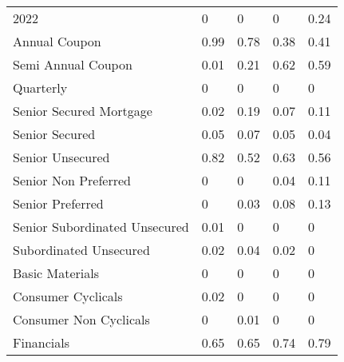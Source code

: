\begin{table}[H]
\begin{tabular}{lllll}
2022 & \cellcolor[HTML]{FCFCFF}0 & \cellcolor[HTML]{FCFCFF}0 & \cellcolor[HTML]{FCFCFF}0 & \cellcolor[HTML]{D7EDDF}0.24 \\
Annual Coupon & \cellcolor[HTML]{63BE7B}0.99 & \cellcolor[HTML]{84CC97}0.78 & \cellcolor[HTML]{C2E5CD}0.38 & \cellcolor[HTML]{BDE3C9}0.41 \\
Semi Annual   Coupon & \cellcolor[HTML]{FBFCFE}0.01 & \cellcolor[HTML]{DCEFE3}0.21 & \cellcolor[HTML]{9DD6AD}0.62 & \cellcolor[HTML]{A1D8B1}0.59 \\
Quarterly & \cellcolor[HTML]{FCFCFF}0 & \cellcolor[HTML]{FCFCFF}0 & \cellcolor[HTML]{FCFCFF}0 & \cellcolor[HTML]{FCFCFF}0 \\
Senior   Secured Mortgage & \cellcolor[HTML]{F9FBFD}0.02 & \cellcolor[HTML]{DFF1E6}0.19 & \cellcolor[HTML]{F2F8F6}0.07 & \cellcolor[HTML]{EBF6F1}0.11 \\
Senior Secured & \cellcolor[HTML]{F5F9F9}0.05 & \cellcolor[HTML]{F2F8F6}0.07 & \cellcolor[HTML]{F5F9F9}0.05 & \cellcolor[HTML]{F6FAFA}0.04 \\
Senior Unsecured & \cellcolor[HTML]{7EC992}0.82 & \cellcolor[HTML]{ACDCBA}0.52 & \cellcolor[HTML]{9BD5AB}0.63 & \cellcolor[HTML]{A6D9B5}0.56 \\
Senior Non   Preferred & \cellcolor[HTML]{FCFCFF}0 & \cellcolor[HTML]{FCFCFF}0 & \cellcolor[HTML]{F6FAFA}0.04 & \cellcolor[HTML]{EBF6F1}0.11 \\
Senior Preferred & \cellcolor[HTML]{FCFCFF}0 & \cellcolor[HTML]{F8FBFB}0.03 & \cellcolor[HTML]{F0F7F5}0.08 & \cellcolor[HTML]{E8F4EE}0.13 \\
Senior   Subordinated Unsecured & \cellcolor[HTML]{FBFCFE}0.01 & \cellcolor[HTML]{FCFCFF}0 & \cellcolor[HTML]{FCFCFF}0 & \cellcolor[HTML]{FCFCFF}0 \\
Subordinated   Unsecured & \cellcolor[HTML]{F9FBFD}0.02 & \cellcolor[HTML]{F6FAFA}0.04 & \cellcolor[HTML]{F9FBFD}0.02 & \cellcolor[HTML]{FCFCFF}0 \\
Basic Materials & \cellcolor[HTML]{FCFCFF}0 & \cellcolor[HTML]{FCFCFF}0 & \cellcolor[HTML]{FCFCFF}0 & \cellcolor[HTML]{FCFCFF}0 \\
Consumer   Cyclicals & \cellcolor[HTML]{F9FBFD}0.02 & \cellcolor[HTML]{FCFCFF}0 & \cellcolor[HTML]{FCFCFF}0 & \cellcolor[HTML]{FCFCFF}0 \\
Consumer   Non Cyclicals & \cellcolor[HTML]{FCFCFF}0 & \cellcolor[HTML]{FBFCFE}0.01 & \cellcolor[HTML]{FCFCFF}0 & \cellcolor[HTML]{FCFCFF}0 \\
Financials & \cellcolor[HTML]{98D4A9}0.65 & \cellcolor[HTML]{98D4A9}0.65 & \cellcolor[HTML]{8ACE9D}0.74 & \cellcolor[HTML]{82CB96}0.79 \\

\end{tabular}
\end{table}
